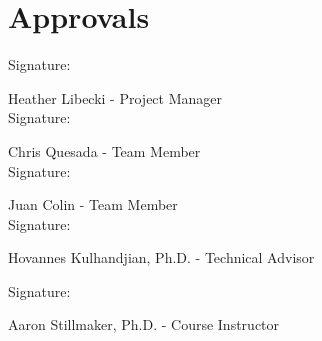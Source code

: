 \section{Approvals}
\setlength{\parindent}{15ex}
\vspace{0.5in}
	\begin{flushleft}
	Signature: \hrulefill
	
	\hspace*{0mm}\phantom{Approved: }Heather Libecki - Project Manager\\
	\vspace{12pt}
	Signature: \hrulefill
	
	\hspace*{0mm}\phantom{Approved: }Chris Quesada - Team Member\\
	\vspace{12pt}
	Signature: \hrulefill
	
	\hspace*{0mm}\phantom{Approved: }Juan Colin - Team Member\\
	\vspace{12pt}
	Signature: \hrulefill
	
	\hspace*{0mm}\phantom{Approved: }Hovannes Kulhandjian, Ph.D. -
	 Technical Advisor\\
	 \vspace{12pt}
	 
	 Signature: \hrulefill
	 
	 \hspace*{0mm}\phantom{Approved: }Aaron Stillmaker, Ph.D. -
	 Course Instructor\\
	 \vspace{12pt}


\end{flushleft}\par
\newpage


	
		
 

